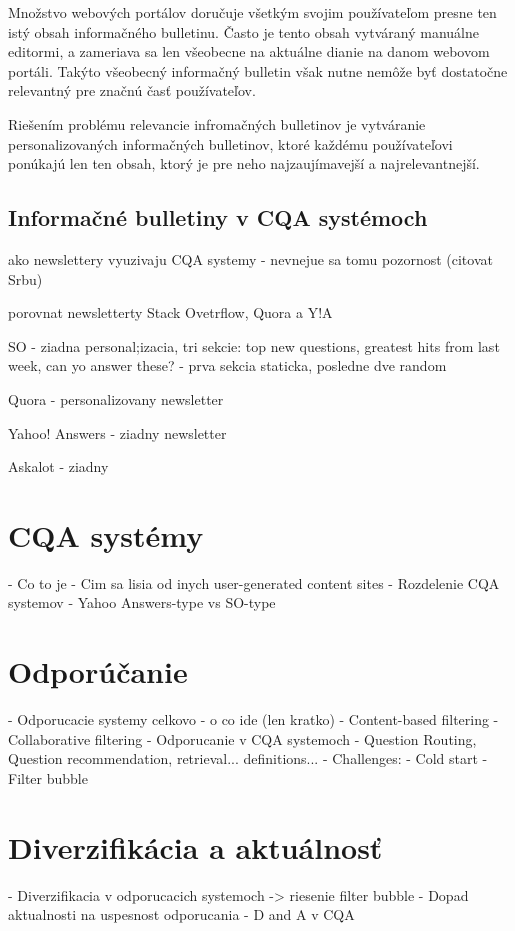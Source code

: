 Množstvo webových portálov doručuje všetkým svojim používateľom presne ten istý obsah informačného bulletinu.
Často je tento obsah vytváraný manuálne editormi, a zameriava sa len všeobecne na aktuálne dianie na danom webovom
portáli. Takýto všeobecný informačný bulletin však nutne nemôže byť dostatočne relevantný pre značnú časť používateľov.

Riešením problému relevancie infromačných bulletinov je vytváranie personalizovaných informačných bulletinov, ktoré
každému používateľovi ponúkajú len ten obsah, ktorý je pre neho najzaujímavejší a najrelevantnejší.


\section{Informačné bulletiny v CQA systémoch}

ako newslettery vyuzivaju CQA systemy - nevnejue sa tomu pozornost (citovat Srbu)\cite{Srba2016}

porovnat newsletterty Stack Ovetrflow, Quora a Y!A

SO - ziadna personal;izacia, tri sekcie: top new questions, greatest hits from last week, can yo answer these?
   - prva sekcia staticka, posledne dve random

Quora - personalizovany newsletter

Yahoo! Answers - ziadny newsletter

Askalot - ziadny





\newpage
\chapter{CQA systémy}

    - Co to je
    - Cim sa lisia od inych user-generated content sites
    - Rozdelenie CQA systemov - Yahoo Answers-type vs SO-type





\chapter{Odporúčanie}

- Odporucacie systemy celkovo - o co ide (len kratko)
    - Content-based filtering
    - Collaborative filtering
- Odporucanie v CQA systemoch
- Question Routing, Question recommendation, retrieval... definitions...
- Challenges:
    - Cold start
    - Filter bubble





\chapter{Diverzifikácia a aktuálnosť}

- Diverzifikacia v odporucacich systemoch -> riesenie filter bubble
- Dopad aktualnosti na uspesnost odporucania
- D and A v CQA
